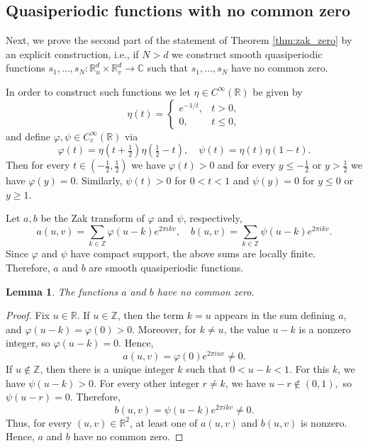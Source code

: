\documentclass[reqno,a4paper,12pt]{amsart}
\numberwithin{equation}{section}
\newtheorem{lemma}[definition]{Lemma}
\def\R{{\mathbb R}}
\newcommand\1{\mathds{1}}
\begin{document}
\subsection{Quasiperiodic functions with no common zero}
Next, we prove the second part of the statement of Theorem \ref{thm:zak_zero} by an explicit construction, i.e., if $N>d$ we construct smooth quasiperiodic functions
$
s_1,\dots,s_N:
\mathbb R^d_u\times\mathbb R^d_v\to\mathbb C
$
such that $s_1,\dots,s_N$ have no common zero. 

In order to construct such functions we let $\eta\in C^\infty(\mathbb R)$ be given by
$$
\eta(t)
=
\begin{cases}
e^{-1/t}, & t>0,\\
0, & t\le 0,
\end{cases}
$$
and define $\varphi,\psi \in C_c^\infty(\R)$ via
$$
\varphi(t)
=
\eta\!\left(t+\tfrac12\right)
\eta\!\left(\tfrac12-t\right), \quad \psi(t)
=
\eta(t)\eta(1-t).
$$
Then for every $t \in (-\frac12,\frac12)$ we have $\varphi(t)>0$ and for every $y \leq -\frac12$ or $y>\frac12$ we have $\varphi(y)=0$.
Similarly, $\psi(t)>0$ for $0<t<1$ and $\psi(y)=0$ for $y \leq 0$ or $y \geq 1$.

Let $a,b$ be the Zak transform of $\varphi$ and $\psi$, respectively,
$$
a(u,v)
=
\sum_{k\in\mathbb Z}
\varphi(u-k)e^{2\pi i k v}, \quad b(u,v)
=
\sum_{k\in\mathbb Z}
\psi(u-k)e^{2\pi i k v}.
$$
Since $\varphi$ and $\psi$ have compact
support, the above sums are locally finite.
Therefore, $a$ and $b$ are smooth quasiperiodic functions.

\begin{lemma}
The functions $a$ and $b$ have no common zero.
\end{lemma}

\begin{proof}
Fix $u\in\mathbb R$.
If $u\in\mathbb Z$, then the term $k=u$ appears in the sum defining $a$,
and
$
\varphi(u-k)=\varphi(0)>0.
$
Moreover, for $k\neq u$, the value $u-k$ is a nonzero integer, so
$
\varphi(u-k)=0.
$
Hence,
$$
a(u,v)=\varphi(0)e^{2\pi i u v}\neq 0.
$$
If $u\notin\mathbb Z$, then there is a unique integer $k$ such that
$
0<u-k<1.
$
For this $k$, we have
$
\psi(u-k)>0.
$
For every other integer $r\neq k$, we have
$
u-r\notin (0,1),
$
so
$
\psi(u-r)=0.
$
Therefore,
$$
b(u,v)=\psi(u-k)e^{2\pi i k v}\neq 0.
$$
Thus, for every $(u,v)\in\mathbb R^2$, at least one of $a(u,v)$ and
$b(u,v)$ is nonzero. Hence, $a$ and $b$ have no common zero.
\end{proof}
\end{document}
